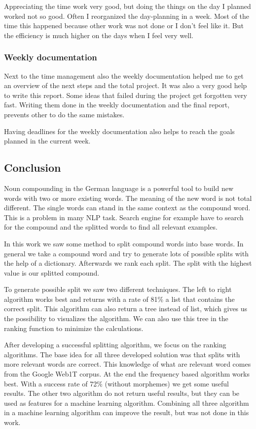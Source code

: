 \documentclass[11pt, accentcolor=tud9b, nochapname]{tudreport}
\begin{document}
Appreciating the time work very good, but doing the things on the day I planned worked not so good. Often I reorganized the day-planning in a week. Most of the time this happened because other work was not done or I don't feel like it. But the efficiency is much higher on the days when I feel very well.

\subsubsection{Weekly documentation}

Next to the time management also the weekly documentation helped me to get an overview of the next steps and the total project. It was also a very good help to write this report. Some ideas that failed during the project get forgotten very fast. Writing them done in the weekly documentation and the final report, prevents other to do the same mistakes.

Having deadlines for the weekly documentation also helps to reach the goals planned in the current week.

\subsection{Conclusion}

Noun compounding in the German language is a powerful tool to build new words with two or more existing words. The meaning of the new word is not total different. The single words can stand in the same context as the compound word. This is a problem in many NLP task. Search engine for example have to search for the compound and the splitted words to find all relevant examples.

In this work we saw some method to split compound words into base words. In general we take a compound word and try to generate lots of possible splits with the help of a dictionary. Afterwards we rank each split. The split with the highest value is our splitted compound.

To generate possible split we saw two different techniques. The left to right algorithm works best and returns with a rate of 81\% a list that contains the correct split. This algorithm can also return a tree instead of list, which gives us the possibility to visualizes the algorithm. We can also use this tree in the ranking function to minimize the calculations.

After developing a successful splitting algorithm, we focus on the ranking algorithms. The base idea for all three developed solution was that splits with more relevant words are correct. This knowledge of what are relevant word comes from the Google Web1T corpus. At the end the frequency based algorithm works best. With a success rate of 72\% (without morphemes) we get some useful results. The other two algorithm do not return useful results, but they can be used as features for a machine learning algorithm. Combining all three algorithm in a machine learning algorithm can improve the result, but was not done in this work.
\end{document}
